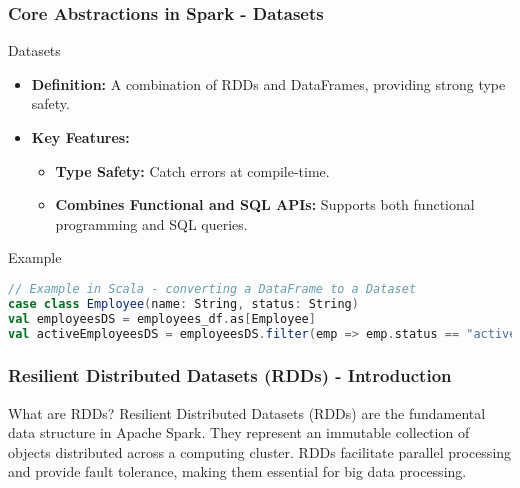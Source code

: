 \documentclass[aspectratio=169]{beamer}
\begin{document}
\begin{frame}[fragile]
    \frametitle{Core Abstractions in Spark - Datasets}
    \begin{block}{Datasets}
        \begin{itemize}
            \item \textbf{Definition:}
                A combination of RDDs and DataFrames, providing strong type safety.
            \item \textbf{Key Features:}
                \begin{itemize}
                    \item \textbf{Type Safety:} Catch errors at compile-time.
                    \item \textbf{Combines Functional and SQL APIs:} Supports both functional programming and SQL queries.
                \end{itemize}
        \end{itemize}
    \end{block}
    \begin{block}{Example}
        \begin{lstlisting}[language=Scala]
// Example in Scala - converting a DataFrame to a Dataset
case class Employee(name: String, status: String)
val employeesDS = employees_df.as[Employee]
val activeEmployeesDS = employeesDS.filter(emp => emp.status == "active")
        \end{lstlisting}
    \end{block}
\end{frame}

\begin{frame}[fragile]
    \frametitle{Resilient Distributed Datasets (RDDs) - Introduction}
    \begin{block}{What are RDDs?}
        Resilient Distributed Datasets (RDDs) are the fundamental data structure in Apache Spark. 
        They represent an immutable collection of objects distributed across a computing cluster. 
        RDDs facilitate parallel processing and provide fault tolerance, making them essential for big data processing.
    \end{block}
\end{frame}
\end{document}
